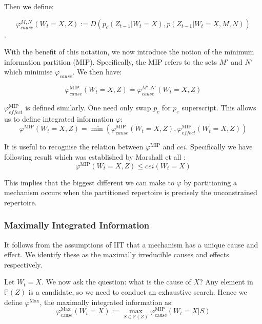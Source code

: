 Then we define:

\begin{equation}
\label{def:phi2}
\varphi_{cause}^{M,N}(W_t=X, Z) := D \left( p_c(Z_{t-1}|W_t=X) ,p(Z_{t-1}|W_{t} = X,M,N)  \right)
\end{equation}.

With the benefit of this notation, we now introduce the notion of the minimum information partition (MIP). Specifically, the MIP refers to the sets $M'$ and $N'$ which minimise $\varphi_{cause}$. We then have:

\begin{equation}
\label{def:phi3}
\varphi_{cause}^{\text{MIP}}(W_t=X, Z)  = \varphi_{cause}^{M',N'}(W_t=X, Z) 
\end{equation}

$\varphi^{\text{MIP}}_{effect}$ is defined similarly. One need only swap $p_c$ for $p_e$ superscript. This allows us to define integrated information $\varphi$:
\begin{equation}
\label{def:phi}
\varphi^{\text{MIP}}(W_t=X, Z) = \min \left( \varphi_{cause}^{\text{MIP}}(W_t=X, Z), \varphi_{effect}^{\text{MIP}}(W_t=X, Z)  \right) 
\end{equation}



It is useful to recognise the relation between $\varphi^{\text{MIP}}$ and $cei$. Specifically we have following result which was established by Marshall et all \cite{marshall2016integrated}:
\begin{equation}
\label{eq:bound_phi_cei}
\varphi^{\text{MIP}}(W_t=X, Z) \leq cei(W_t=X) 
\end{equation}

This implies that the biggest different we can make to $\varphi$ by partitioning a mechanism occurs when the partitioned repertoire is precisely the unconstrained repertoire. 



\subsubsection{Maximally Integrated Information}
It follows from the assumptions of IIT that a mechanism has a unique cause and effect. We identify these as the maximally irreducible causes and effects respectively. 

Let $W_t = X$. We now ask the question: what is the cause of $X$? Any element in $\mathbb{P}(Z)$ is a candidate, so we need to conduct an exhaustive search. Hence we define $\varphi^{\text{Max}}$, the maximally integrated information as: 
\begin{equation}
\label{def:core_cause}
\varphi^{\text{Max}}_{\text{cause}}(W_t = X):=\max \limits_{S \in \mathbb{P}(Z)}\varphi^{\text{MIP}}_{\text{cause}}(W_t = X|S)
\end{equation}

